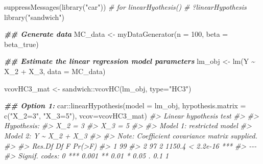 \documentclass[
  14pt,
]{memoir}
\newenvironment{Shaded}{\begin{snugshade}}{\end{snugshade}}
\newcommand{\AttributeTok}[1]{\textcolor[rgb]{0.77,0.63,0.00}{#1}}
\newcommand{\CommentTok}[1]{\textcolor[rgb]{0.56,0.35,0.01}{\textit{#1}}}
\newcommand{\DecValTok}[1]{\textcolor[rgb]{0.00,0.00,0.81}{#1}}
\newcommand{\DocumentationTok}[1]{\textcolor[rgb]{0.56,0.35,0.01}{\textbf{\textit{#1}}}}
\newcommand{\FunctionTok}[1]{\textcolor[rgb]{0.00,0.00,0.00}{#1}}
\newcommand{\NormalTok}[1]{#1}
\newcommand{\OtherTok}[1]{\textcolor[rgb]{0.56,0.35,0.01}{#1}}
\newcommand{\SpecialCharTok}[1]{\textcolor[rgb]{0.00,0.00,0.00}{#1}}
\newcommand{\StringTok}[1]{\textcolor[rgb]{0.31,0.60,0.02}{#1}}
\begin{document}
\begin{Shaded}
\begin{Highlighting}[]
\FunctionTok{suppressMessages}\NormalTok{(}\FunctionTok{library}\NormalTok{(}\StringTok{"car"}\NormalTok{)) }\CommentTok{\# for linearHyothesis()}
\CommentTok{\# ?linearHypothesis}
\FunctionTok{library}\NormalTok{(}\StringTok{"sandwich"}\NormalTok{)}

\DocumentationTok{\#\# Generate data}
\NormalTok{MC\_data }\OtherTok{\textless{}{-}} \FunctionTok{myDataGenerator}\NormalTok{(}\AttributeTok{n    =} \DecValTok{100}\NormalTok{, }
                           \AttributeTok{beta =}\NormalTok{ beta\_true)}

\DocumentationTok{\#\# Estimate the linear regression model parameters}
\NormalTok{lm\_obj }\OtherTok{\textless{}{-}} \FunctionTok{lm}\NormalTok{(Y }\SpecialCharTok{\textasciitilde{}}\NormalTok{ X\_2 }\SpecialCharTok{+}\NormalTok{ X\_3, }\AttributeTok{data =}\NormalTok{ MC\_data)}

\NormalTok{vcovHC3\_mat }\OtherTok{\textless{}{-}}\NormalTok{ sandwich}\SpecialCharTok{::}\FunctionTok{vcovHC}\NormalTok{(lm\_obj, }\AttributeTok{type=}\StringTok{"HC3"}\NormalTok{)}

\DocumentationTok{\#\# Option 1:}
\NormalTok{car}\SpecialCharTok{::}\FunctionTok{linearHypothesis}\NormalTok{(}\AttributeTok{model =}\NormalTok{ lm\_obj, }
                      \AttributeTok{hypothesis.matrix =} \FunctionTok{c}\NormalTok{(}\StringTok{"X\_2=3"}\NormalTok{, }\StringTok{"X\_3=5"}\NormalTok{), }
                      \AttributeTok{vcov=}\NormalTok{vcovHC3\_mat)}
\CommentTok{\#\textgreater{} Linear hypothesis test}
\CommentTok{\#\textgreater{} }
\CommentTok{\#\textgreater{} Hypothesis:}
\CommentTok{\#\textgreater{} X\_2 = 3}
\CommentTok{\#\textgreater{} X\_3 = 5}
\CommentTok{\#\textgreater{} }
\CommentTok{\#\textgreater{} Model 1: restricted model}
\CommentTok{\#\textgreater{} Model 2: Y \textasciitilde{} X\_2 + X\_3}
\CommentTok{\#\textgreater{} }
\CommentTok{\#\textgreater{} Note: Coefficient covariance matrix supplied.}
\CommentTok{\#\textgreater{} }
\CommentTok{\#\textgreater{}   Res.Df Df      F    Pr(\textgreater{}F)    }
\CommentTok{\#\textgreater{} 1     99                        }
\CommentTok{\#\textgreater{} 2     97  2 1150.4 \textless{} 2.2e{-}16 ***}
\CommentTok{\#\textgreater{} {-}{-}{-}}
\CommentTok{\#\textgreater{} Signif. codes:  0 \textquotesingle{}***\textquotesingle{} 0.001 \textquotesingle{}**\textquotesingle{} 0.01 \textquotesingle{}*\textquotesingle{} 0.05 \textquotesingle{}.\textquotesingle{} 0.1 \textquotesingle{} \textquotesingle{} 1}


\end{Highlighting}
\end{Shaded}
\end{document}
